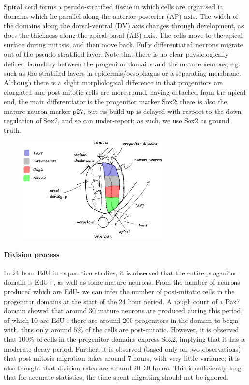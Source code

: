 \documentclass[10pt,english]{report}
\begin{document}
Spinal cord forms a pseudo-stratified tissue in which cells are organised in domains which lie parallel along the anterior-posterior (AP) axis. The width of the domains along the dorsal-ventral (DV) axis changes through development, as does the thickness along the apical-basal (AB) axis. The cells move to the apical surface during mitosis, and then move back. Fully differentiated neurons migrate out of the pseudo-stratified layer. Note that there is no clear physiologically defined boundary between the progenitor domains and the mature neurons, e.g. such as the stratified layers in epidermis/oesophagus or a separating membrane. Although there is a slight morphological difference in that progenitors are elongated and post-mitotic cells are more round, having detached from the apical end, the main differentiator is the progenitor marker Sox2; there is also the mature neuron marker p27, but its build up is delayed with respect to the down regulation of Sox2, and so can under-report; as such, we use Sox2 as ground truth.

\begin{figure}[h]
	\begin{center}
		\includegraphics[width=3in]{spinal-chord-anatomy.png}
	\end{center}
\end{figure}

\paragraph{Division process}

In 24 hour EdU incorporation studies, it is observed that the entire progenitor domain is EdU+, as well as some mature neurons. From the number of neurons produced which are EdU- we can infer the number of post-mitotic cells in the progenitor domains at the start of the 24 hour period. A rough count of a Pax7 domain showed that around 30 mature neurons are produced during this period, of which 10 are EdU-; there are around 200 progenitors in the domain to begin with, thus only around $5\%$ of the cells are post-mitotic. However, it is observed that $100\%$ of cells in the progenitor domains express Sox2, implying that it has a moderate decay period. Further, it is observed (based only on two observations) that post-mitosis migration takes around 7 hours, with very little variance; it is also thought that division rates are around 20--30 hours. This is sufficiently long that for accurate statistics, the time spent migrating should not be ignored.
\end{document}
